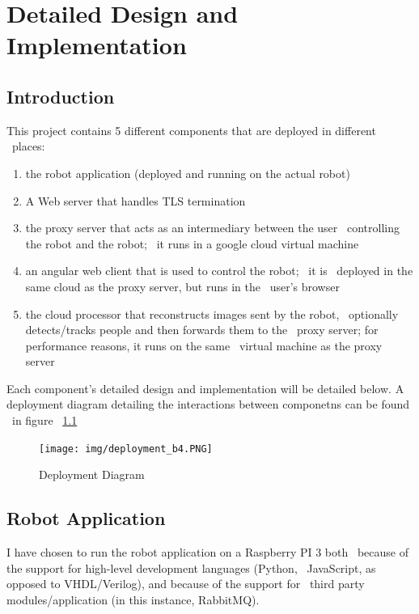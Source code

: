 \chapter{Detailed Design and Implementation}
\label{ch:implementation}

\section{Introduction}
\label{sec:implementation-introduction}
This project contains 5 different components that are deployed in different \
places:
\begin{enumerate}
    \item the robot application (deployed and running on the actual robot)
    \item A Web server that handles TLS termination
    \item the proxy server that acts as an intermediary between the user \
            controlling the robot and the robot; \
            it runs in a google cloud virtual machine
    \item an angular web client that is used to control the robot; \
            it is \
            deployed in the same cloud as the proxy server, but runs in the \
            user's browser
    \item the cloud processor that reconstructs images sent by the robot, \
            optionally detects/tracks people and then forwards them to the \
            proxy server; for performance reasons, it runs on the same \
            virtual machine as the proxy server
\end{enumerate}

Each component's detailed design and implementation will be detailed below.
A deployment diagram detailing the interactions between componetns can be found \
in figure ~\ref{fig:deployment-diagram}

\begin{figure}[ht]
    \label{fig:deployment-diagram}
    \centering
    \texttt{[image: img/deployment\_b4.PNG]}
    \caption{Deployment Diagram}
\end{figure}

\section{Robot Application}
\label{sec:robot-application}
I have chosen to run the robot application on a Raspberry PI 3 both \
because of the support for high-level development languages (Python, \
JavaScript, as opposed to VHDL/Verilog), and because of the support for \
third party modules/application (in this instance, RabbitMQ).

